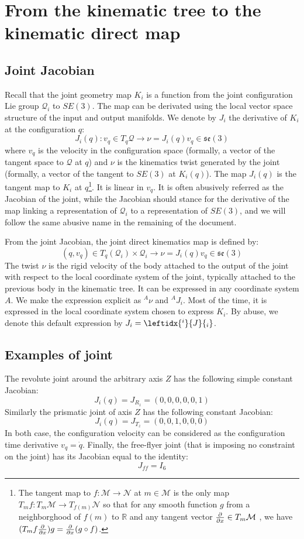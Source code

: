 \documentclass{book}
\begin{document}
\section{From the kinematic tree to the kinematic direct map}

\subsection{Joint Jacobian}

Recall that the joint geometry map $K_i$ is a function from the joint configuration Lie group $\mathcal{Q}_i$ to $SE(3)$. The map can be derivated using the local vector space structure of the input and output manifolds. We denote by $J_i$ the derivative of $K_i$ at the configuration $q$:
$$ J_i(q): v_q \in T_q\mathcal{Q} \rightarrow \nu = J_i(q) v_q \in \mathfrak{se}(3) $$
where $v_q$ is the velocity in the configuration space (formally, a vector of the tangent space to $\mathcal{Q}$ at $q$) and $\nu$ is the kinematics twist generated by the joint (formally, a vector of the tangent to $SE(3)$ at $K_i(q)$). The map $J_i(q)$ is the tangent map to $K_i$ at $q$\footnote{The tangent map to $f : \mathcal{M} \rightarrow \mathcal{N}$ at $m \in \mathcal{M}$  is the only map $T_mf : T_m\mathcal{M} \rightarrow T_{f(m)}\mathcal{N}$ so that for any smooth function $g$ from a neighborghood of $f(m)$ to $\mathbb{R}$ and any tangent vector $\frac{\partial{}}{\partial{x}} \in T_m\mathcal{M}$ , we have $(T_mf \frac{\partial{}}{\partial{x}})g = \frac{\partial{}}{\partial{x}} (g \circ f)$.}. It is linear in $v_q$. It is often abusively referred as the Jacobian of the joint, while the Jacobian should stance for the derivative of the map linking a representation of $\mathcal{Q}_i$ to a representation of $SE(3)$, and we will follow the same abusive name in the remaining of the document.

From the joint Jacobian, the joint direct kinematics map is defined by:
$$ (q,v_q) \in T_q(\mathcal{Q}_i)\times\mathcal{Q}_i \rightarrow \nu = J_i(q) v_q \in \mathfrak{se}(3) $$
The twist $\nu$ is the rigid velocity of the body attached to the output of the joint with respect to the local coordinate system of the joint, typically attached to the previous body in the kinematic tree. It can be expressed in any coordinate system $A$. We make the expression explicit as $^A\nu$ and $^AJ_i$. Most of the time, it is expressed in the local coordinate system chosen to express $K_i$. By abuse, we denote this default expression by $J_i= \leftidx{^i}{J}{_i}$.

\subsection{Examples of joint}
The revolute joint around the arbitrary axis $Z$ has the following simple constant Jacobian:
$$ J_i(q) = J_{R_z} = (0,0,0,0,0,1) $$
Similarly the prismatic joint of axis $Z$ has the following constant Jacobian:
$$ J_i(q) = J_{T_z} = (0,0,1,0,0,0) $$
In both case, the configuration velocity can be considered as the configuration time derivative $v_q = \dot q$. Finally, the free-flyer joint (that is imposing no constraint on the joint) has its Jacobian equal to the identity:
$$ J_{ff} = I_6$$
\end{document}
